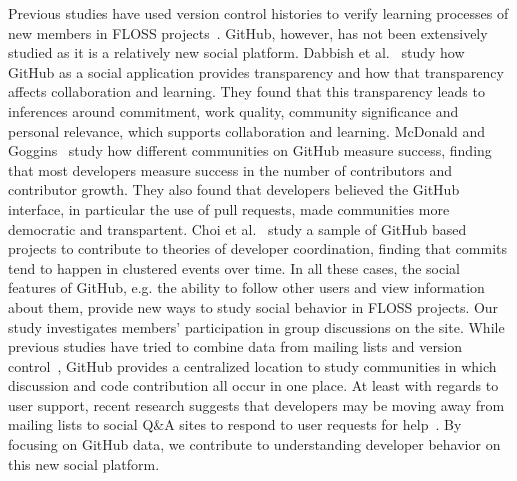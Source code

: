 \documentclass{iitthesis}
\begin{document}
Previous studies have used version control histories to verify learning
processes of new members in FLOSS projects~\cite{huang_mining_2005}. GitHub,
however, has not been extensively studied as it is a relatively new social
platform. Dabbish et al.~\cite{dabbish_social_2012} study how GitHub as a social
application provides transparency and how that transparency affects
collaboration and learning. They found that this transparency leads to
inferences around commitment, work quality, community significance and personal
relevance, which supports collaboration and learning. McDonald and
Goggins~\cite{mcdonald_performance_2013} study how different communities on
GitHub measure success, finding that most developers measure success in the
number of contributors and contributor growth. They also found that developers
believed the GitHub interface, in particular the use of pull requests, made
communities more democratic and transpartent. Choi et
al.~\cite{choi_herding_2013} study a sample of GitHub based projects to
contribute to theories of developer coordination, finding that commits tend to
happen in clustered events over time. In all these cases, the social features of
GitHub, e.g. the ability to follow other users and view information about them,
provide new ways to study social behavior in FLOSS projects. Our study
investigates members' participation in group discussions on the site. While
previous studies have tried to combine data from mailing lists and version
control~\cite{ducheneaut_socialization_2005}, GitHub provides a centralized
location to study communities in which discussion and code contribution all
occur in one place. At least with regards to user support, recent research
suggests that developers may be moving away from mailing lists to social Q\&A
sites to respond to user requests for help~\cite{vasilescu_how_2014}. By
focusing on GitHub data, we contribute to understanding developer behavior on
this new social platform.
\end{document}
